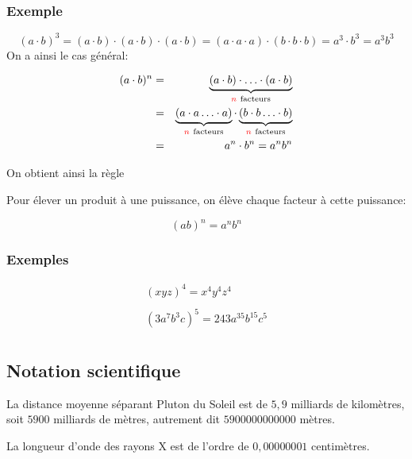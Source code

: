 \documentclass[
  12pt,
]{book}
\begin{document}
\hypertarget{exemple-2}{%
\subsubsection{Exemple}\label{exemple-2}}

\[(a\cdot b)^3 = (a\cdot b)\cdot (a\cdot b)\cdot (a\cdot b) =(a\cdot a\cdot a)\cdot (b\cdot b\cdot b)= a^3\cdot b^3= a^3b^3\]
On a ainsi le cas général:

\begin{align*}
(a\cdot b)^n & = &\underbrace{(a\cdot b)\cdot \ldots \cdot (a\cdot b)}_{{\color{red}n}~\text{facteurs}}\\
             & = & \underbrace{(a\cdot a\ldots\cdot a)}_{{\color{red}n}~\text{facteurs}}\cdot
                   \underbrace{(b\cdot b\ldots\cdot b)}_{{\color{red}n}~\text{facteurs}}\\
             & = & a^n\cdot b^n= a^nb^n
\end{align*}

On obtient ainsi la règle

\begin{reglebox}
Pour élever un produit à une puissance, on élève chaque facteur à cette puissance:

\[(ab)^n = a^nb^n\]

\end{reglebox}

\hypertarget{exemples-4}{%
\subsubsection{Exemples}\label{exemples-4}}

\begin{align*}
(xyz)^4 = x^4y^4z^4\\ 
\\ 
(3a^7b^3c)^5 = 243a^{35}b^{15}c^5\\ 
\end{align*}

\hypertarget{notation-scientifique}{%
\subsection{Notation scientifique}\label{notation-scientifique}}

La distance moyenne séparant Pluton du Soleil est de \(5{,}9\) milliards de kilomètres, soit \(5 900\) milliards de mètres, autrement dit \(5 900 000 000 000\) mètres.

La longueur d'onde des rayons X est de l'ordre de \(0{,}000 000 01\) centimètres.
\end{document}
